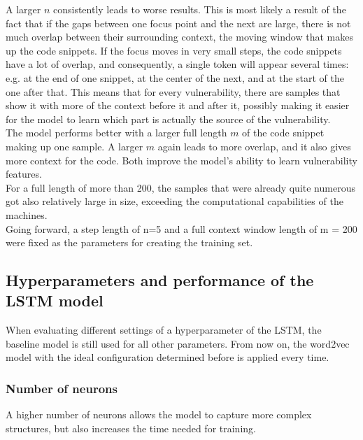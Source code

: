 \documentclass[
	a4paper,
	pagesize,
	pdftex,
	12pt,
	twoside, %
	BCOR=5mm, %
	ngerman,
	fleqn,
	final,
	]{scrartcl}
\begin{document}
A larger $n$ consistently leads to worse results. This is most likely a result of the fact that if the gaps between one focus point and the next are large, there is not much overlap between their surrounding context, the moving window that makes up the code snippets. If the focus moves in very small steps, the code snippets have a lot of overlap, and consequently, a single token will appear several times: e.g. at the end of one snippet, at the center of the next, and at the start of the one after that. This means that for every vulnerability, there are samples that show it with more of the context before it and after it, possibly making it easier for the model to learn which part is actually the source of the vulnerability.\\
The model performs better with a larger full length $m$ of the code snippet making up one sample. A larger $m$ again leads to more overlap, and it also gives more context for the code. Both improve the model's ability to learn vulnerability features. \\
For a full length of more than 200, the samples that were already quite numerous got also relatively large in size, exceeding the computational capabilities of the machines. \\
Going forward, a step length of n=5 and a full context window length of m = 200 were fixed as the parameters for creating the training set.

\subsection{Hyperparameters and performance of the LSTM model}

When evaluating different settings of a hyperparameter of the LSTM, the baseline model is still used for all other parameters. From now on, the word2vec model with the ideal configuration determined before is applied every time.

\subsubsection{Number of neurons}
A higher number of neurons allows the model to capture more complex structures, but also increases the time needed for training.
\end{document}
